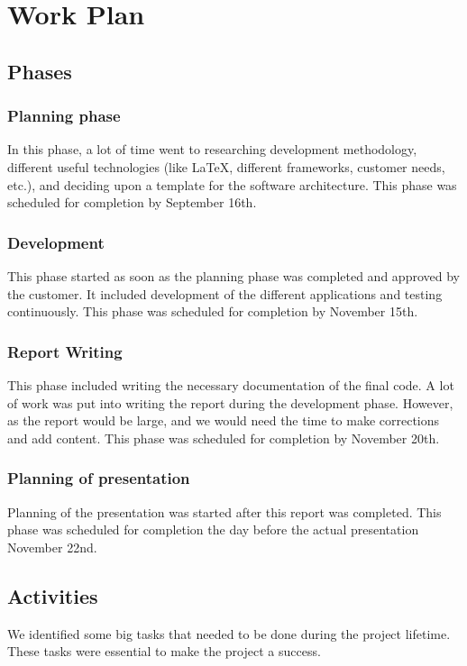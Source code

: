 \section{Work Plan}
\label{sec:workplan}

\subsection{Phases}

\subsubsection{Planning phase}
In this phase, a lot of time went to researching development methodology,
different useful technologies (like \LaTeX{}, different frameworks, customer
needs, etc.), and deciding upon a template for the software architecture. This phase was scheduled 
for completion by September 16th. 

\subsubsection{Development}
This phase started as soon as the planning phase was completed and
approved by the customer. It included development of the different
applications and testing continuously. This phase was scheduled for completion by
November 15th.

\subsubsection{Report Writing}
This phase included writing the necessary documentation of the final code. A lot of work
was put into writing the report during the development phase. However, as the
report would be large, and we would need the time to make corrections
and add content. This phase was scheduled for completion by November 20th. 

\subsubsection{Planning of presentation}
Planning of the presentation was started after this report was completed. This phase was scheduled
for completion the day before the actual presentation November 22nd. 

\subsection{Activities}
\label{sec:activities}
We identified some big tasks that needed to be done during the project lifetime. These
tasks were essential to make the project a success. 

